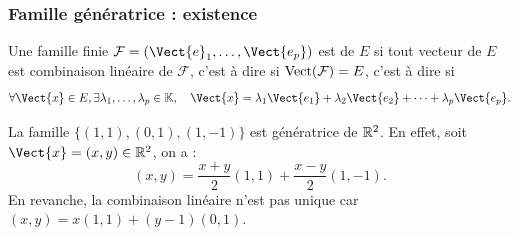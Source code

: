 \documentclass{book}
\begin{document}
\subsubsection{Famille génératrice : existence}
\begin{Definition} Une famille finie  $\mathcal{F}=(\Vect{e}_1,\dots,\Vect{e_p})$ est  de $E$ si tout vecteur de $E$ est combinaison linéaire de $\mathcal{F}$, c'est à dire si $\operatorname{Vect}(\mathcal{F}) = E$, c'est à dire si 
\[ \forall \Vect{x} \in E,\exists \lambda_1,\dots,\lambda_p \in \K,\quad \Vect{x} = \lambda_1 \Vect{e_1}+ \lambda_2 \Vect{e_2}+\dots +\lambda_p \Vect{e_p}. \]
\end{Definition}
\begin{Exemple} La famille  $\{(1,1), (0,1), (1,-1)\}$  est génératrice de $\mathbb{R}^2$. En effet, soit $\Vect{x}=(x,y)\in\R^2$, on a :
$$(x,y)=\frac{x+y}{2}(1,1)+ \frac{x-y}{2} (1,-1).$$
En revanche,  la combinaison linéaire n'est pas unique car $(x,y)= x(1,1)+(y-1)(0,1).$
\end{Exemple}
\end{document}
